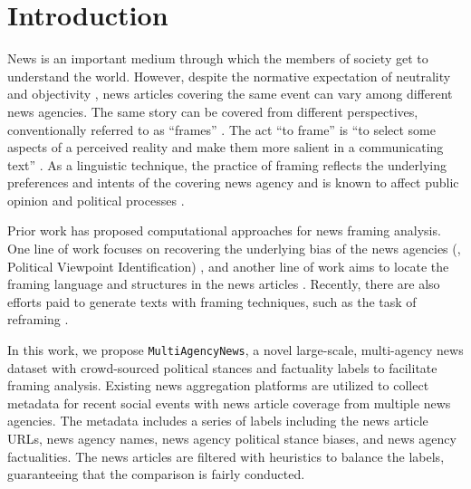 \chapter{Introduction}

News is an important medium through which the members of society get to understand the world. However, despite the normative expectation of neutrality and objectivity \cite{schudson2001objectivity}, news articles covering the same event can vary among different news agencies. The same story can be covered from different perspectives, conventionally referred to as ``frames'' \cite{entman1993,entman2007,entman2010media}. The act ``to frame'' is ``to select some aspects of a perceived reality and make them more salient in a communicating text'' \cite{entman1993}. As a linguistic technique, the practice of framing reflects the underlying preferences and intents of the covering news agency and is known to affect public opinion and political processes \cite{chong2007framing,iyengar1990framing,mccombs2002agenda,price2005framing,rugg1941experiments,schuldt2011global,baumgartner2008decline,dardis2008media,hamborg2020media,drakulich2015explicit,sap2019social}.

Prior work has proposed computational approaches for news framing analysis. One line of work focuses on recovering the underlying bias of the news agencies (\ie, Political Viewpoint Identification) \cite{PVI-survey,li-goldwasser-2021-using,kim-johnson-2022-close,matero-etal-2021-melt-message,li-caragea-2021-multi}, and another line of work aims to locate the framing language and structures in the news articles \cite{hamborg2020media,drakulich2015explicit,sap2019social,baumer-etal-2015-testing}. Recently, there are also efforts paid to generate texts with framing techniques, such as the task of reframing \cite{ziems-etal-2022-inducing,chen-etal-2021-controlled-neural}.

In this work, we propose \texttt{MultiAgencyNews}, a novel large-scale, multi-agency news dataset with crowd-sourced political stances and factuality labels to facilitate framing analysis. Existing news aggregation platforms are utilized to collect metadata for recent social events with news article coverage from multiple news agencies. The metadata includes a series of labels including the news article URLs, news agency names, news agency political stance biases, and news agency factualities. The news articles are filtered with heuristics to balance the labels, guaranteeing that the comparison is fairly conducted.

